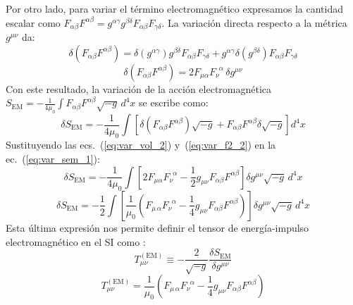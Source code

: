 Por otro lado, para variar el término electromagnético expresamos la cantidad escalar como $F_{\alpha\beta} F^{\alpha\beta} = g^{\alpha\gamma} g^{\beta\delta} F_{\alpha\beta} F_{\gamma\delta}$. La variación directa respecto a la métrica $g^{\mu\nu}$ da:
\begin{equation}
    \delta \left( F_{\alpha\beta} F^{\alpha\beta} \right) = \delta(g^{\alpha\gamma}) g^{\beta\delta} F_{\alpha\beta} F_{\gamma\delta} + g^{\alpha\gamma} \delta(g^{\beta\delta}) F_{\alpha\beta} F_{\gamma\delta}
    \label{eq:var_f2_1}
\end{equation}
\begin{equation}
    \delta \left( F_{\alpha\beta} F^{\alpha\beta} \right) = 2 F_{\mu\alpha} F_{\nu}^{\phantom{\nu}\alpha} \, \delta g^{\mu\nu}
    \label{eq:var_f2_2}
\end{equation}
Con este resultado, la variación de la acción electromagnética $S_{\mathrm{EM}} = -\frac{1}{4\mu_0} \int F_{\alpha\beta} F^{\alpha\beta} \sqrt{-g} \, d^4x$ se escribe como:
\begin{equation}
    \delta S_{\mathrm{EM}} = -\frac{1}{4\mu_0} \int \left[ \delta\left(F_{\alpha\beta} F^{\alpha\beta}\right) \sqrt{-g} + F_{\alpha\beta} F^{\alpha\beta} \delta\sqrt{-g} \right] d^4x
    \label{eq:var_sem_1}
\end{equation}
Sustituyendo las ecs.~(\ref{eq:var_vol_2}) y~(\ref{eq:var_f2_2}) en la ec.~(\ref{eq:var_sem_1}):
\begin{equation}
    \delta S_{\mathrm{EM}} = -\frac{1}{4\mu_0} \int \left[ 2 F_{\mu\alpha} F_{\nu}^{\phantom{\nu}\alpha} - \frac{1}{2} g_{\mu\nu} F_{\alpha\beta} F^{\alpha\beta} \right] \delta g^{\mu\nu} \sqrt{-g} \, d^4x
    \label{eq:var_sem_2}
\end{equation}
\begin{equation}
    \delta S_{\mathrm{EM}} = -\frac{1}{2} \int \left[ \frac{1}{\mu_0} \left( F_{\mu\,\alpha}F_\nu^{\phantom{\nu}\alpha} - \frac{1}{4}g_{\mu\nu} F_{\alpha\beta}F^{\alpha\beta} \right) \right] \delta g^{\mu\nu} \sqrt{-g} \, d^4x
    \label{eq:var_sem_3}
\end{equation}
Esta última expresión nos permite definir el tensor de energía-impulso electromagnético en el SI como \citep{M_P_Hobson_General_Relativity, 05villegas}:
\begin{equation}
    T_{\mu\nu}^{(\mathrm{EM})} \equiv -\frac{2}{\sqrt{-g}} \frac{\delta S_{\mathrm{EM}}}{\delta g^{\mu\nu}}
    \label{eq:def_tensor_EM}
\end{equation}
\begin{equation}
    T_{\mu\nu}^{(\mathrm{EM})} = \frac{1}{\mu_0} \left( F_{\mu\,\alpha}F_\nu^{\phantom{\nu}\alpha} - \frac{1}{4}g_{\mu\nu} F_{\alpha\beta}F^{\alpha\beta} \right)
    \label{eq:tensor_EM_SI}
\end{equation}

